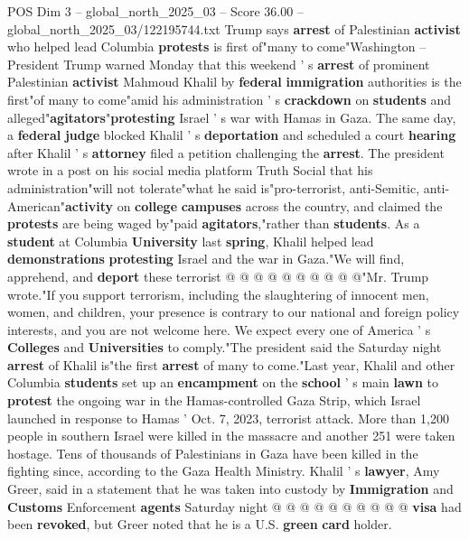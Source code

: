 \begin{textsample}{POS Dim 3 – global\_north\_2025\_03 – Score 36.00 – global\_north\_2025\_03/122195744.txt}  \label{ex:f3_pos_022}
Trump says \textbf{arrest} of Palestinian \textbf{activist} who helped lead Columbia \textbf{protests} is first of"many to come"Washington -- President Trump warned Monday that this weekend ' s \textbf{arrest} of prominent Palestinian \textbf{activist} Mahmoud Khalil by \textbf{federal} \textbf{immigration} authorities is the first"of many to come"amid his administration ' s \textbf{crackdown} on \textbf{students} and alleged"\textbf{agitators}"\textbf{protesting} Israel ' s war with Hamas in Gaza.
The same day, a \textbf{federal} \textbf{judge} blocked Khalil ' s \textbf{deportation} and scheduled a court \textbf{hearing} after Khalil ' s \textbf{attorney} filed a petition challenging the \textbf{arrest}.
The president wrote in a post on his social media platform Truth Social that his administration"will not tolerate"what he said is"pro-terrorist, anti-Semitic, anti-American"\textbf{activity} on \textbf{college} \textbf{campuses} across the country, and claimed the \textbf{protests} are being waged by"paid \textbf{agitators},"rather than \textbf{students}.
As a \textbf{student} at Columbia \textbf{University} last \textbf{spring}, Khalil helped lead \textbf{demonstrations} \textbf{protesting} Israel and the war in Gaza."We will find, apprehend, and \textbf{deport} these terrorist @ @ @ @ @ @ @ @ @ @"Mr.
Trump wrote."If you support terrorism, including the slaughtering of innocent men, women, and children, your presence is contrary to our national and foreign policy interests, and you are not welcome here.
We expect every one of America ' s \textbf{Colleges} and \textbf{Universities} to comply."The president said the Saturday night \textbf{arrest} of Khalil is"the first \textbf{arrest} of many to come."Last year, Khalil and other Columbia \textbf{students} set up an \textbf{encampment} on the \textbf{school} ' s main \textbf{lawn} to \textbf{protest} the ongoing war in the Hamas-controlled Gaza Strip, which Israel launched in response to Hamas ' Oct. 7, 2023, terrorist attack.
More than 1,200 people in southern Israel were killed in the massacre and another 251 were taken hostage.
Tens of thousands of Palestinians in Gaza have been killed in the fighting since, according to the Gaza Health Ministry.
Khalil ' s \textbf{lawyer}, Amy Greer, said in a statement that he was taken into custody by \textbf{Immigration} and \textbf{Customs} Enforcement \textbf{agents} Saturday night @ @ @ @ @ @ @ @ @ @ \textbf{visa} had been \textbf{revoked}, but Greer noted that he is a U.S. \textbf{green} \textbf{card} holder.

\end{textsample}
